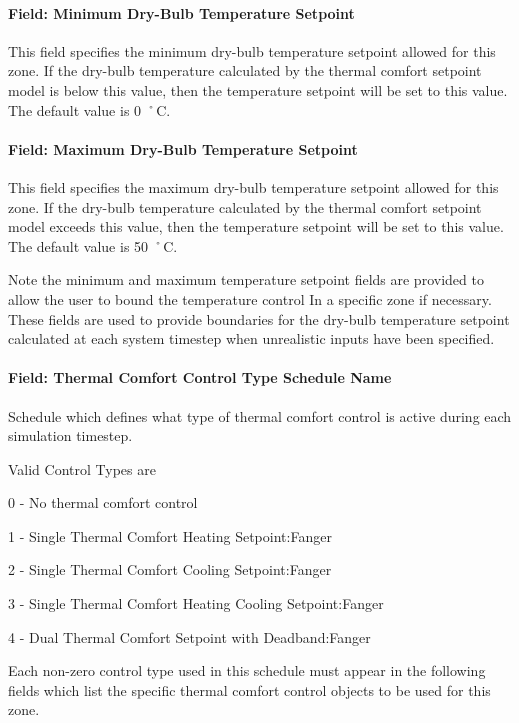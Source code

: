 \paragraph{Field: Minimum Dry-Bulb Temperature Setpoint}\label{field-minimum-dry-bulb-temperature-setpoint}

This field specifies the minimum dry-bulb temperature setpoint allowed for this zone. If the dry-bulb temperature calculated by the thermal comfort setpoint model is below this value, then the temperature setpoint will be set to this value. The default value is 0 ˚C.

\paragraph{Field: Maximum Dry-Bulb Temperature Setpoint}\label{field-maximum-dry-bulb-temperature-setpoint}

This field specifies the maximum dry-bulb temperature setpoint allowed for this zone. If the dry-bulb temperature calculated by the thermal comfort setpoint model exceeds this value, then the temperature setpoint will be set to this value. The default value is 50 ˚C.

Note the minimum and maximum temperature setpoint fields are provided to allow the user to bound the temperature control In a specific zone if necessary. These fields are used to provide boundaries for the dry-bulb temperature setpoint calculated at each system timestep when unrealistic inputs have been specified.

\paragraph{Field: Thermal Comfort Control Type Schedule Name}\label{field-thermal-comfort-control-type-schedule-name}

Schedule which defines what type of thermal comfort control is active during each simulation timestep.

Valid Control Types are

0 - No thermal comfort control

1 - Single Thermal Comfort Heating Setpoint:Fanger

2 - Single Thermal Comfort Cooling Setpoint:Fanger

3 - Single Thermal Comfort Heating Cooling Setpoint:Fanger

4 - Dual Thermal Comfort Setpoint with Deadband:Fanger

Each non-zero control type used in this schedule must appear in the following fields which list the specific thermal comfort control objects to be used for this zone.

